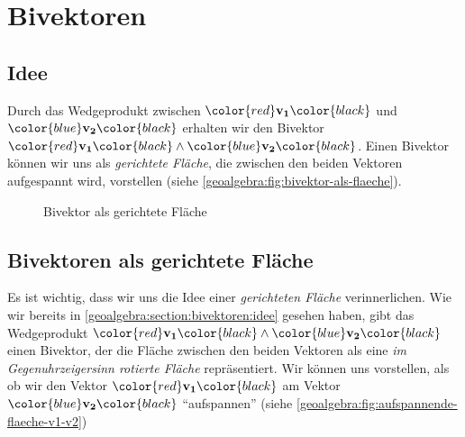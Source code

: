 
\section{Bivektoren
\label{geoalgebra:section:bivektoren}}
\subsection{Idee}
\label{geoalgebra:section:bivektoren:idee}
\newcommand{\vone}{\color{red}\mathbf{v_1}\color{black}}
\newcommand{\vtwo}{\color{blue}\mathbf{v_2}\color{black}}
Durch das Wedgeprodukt zwischen $\vone$ und $\vtwo$ erhalten wir
den
Bivektor $\vone \wedge \vtwo$. Einen Bivektor können wir uns als \emph{gerichtete Fläche}, die zwischen den beiden Vektoren aufgespannt
wird, vorstellen (siehe \autoref{geoalgebra:fig:bivektor-als-flaeche}).
\begin{figure}
  \begin{center}
  \end{center}
  \caption{Bivektor als gerichtete Fläche}\label{geoalgebra:fig:bivektor-als-flaeche}
\end{figure}

\subsection{Bivektoren als gerichtete Fläche}
Es ist wichtig, dass wir uns die Idee einer \emph{gerichteten Fläche}
verinnerlichen. Wie wir bereits in \autoref{geoalgebra:section:bivektoren:idee} gesehen haben,
gibt das Wedgeprodukt $\vone \wedge \vtwo$
einen Bivektor, der die Fläche zwischen den beiden Vektoren als
eine \emph{im Gegenuhrzeigersinn rotierte Fläche} repräsentiert.
Wir können uns vorstellen, als ob wir den Vektor $\vone$
am Vektor $\vtwo$ ``aufspannen'' (siehe \autoref{geoalgebra:fig:aufspannende-flaeche-v1-v2})

